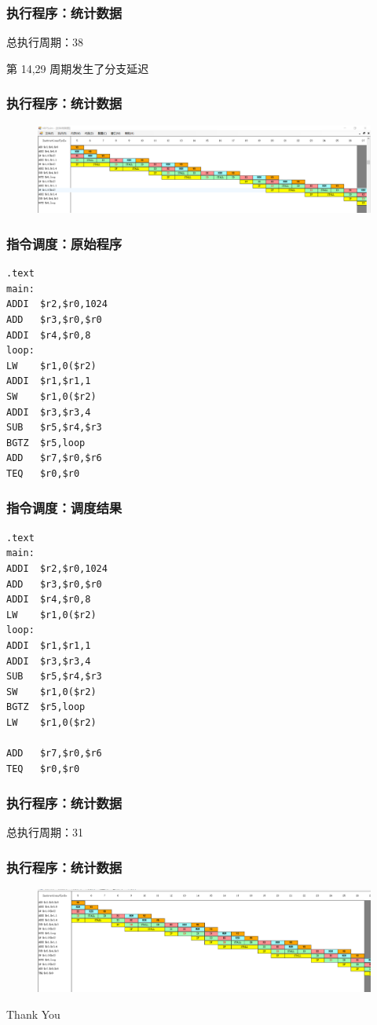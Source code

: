\documentclass[UTF8]{ctexbeamer}
\begin{document}
\begin{frame}
    \frametitle{执行程序：统计数据}
    \centering 总执行周期：38

    \centering 第 14,29 周期发生了分支延迟
\end{frame}

\begin{frame}
    \frametitle{执行程序：统计数据}
    \begin{figure}[H]
        \centering
        \includegraphics[width=\textwidth]{fig/branch.png}
      \end{figure}
\end{frame}

\begin{frame}[fragile]
    \frametitle{指令调度：原始程序}
    \begin{lstlisting}
.text
main:
ADDI  $r2,$r0,1024
ADD   $r3,$r0,$r0
ADDI  $r4,$r0,8
loop:  
LW    $r1,0($r2)
ADDI  $r1,$r1,1
SW    $r1,0($r2)
ADDI  $r3,$r3,4
SUB   $r5,$r4,$r3
BGTZ  $r5,loop
ADD   $r7,$r0,$r6
TEQ   $r0,$r0
    \end{lstlisting}
\end{frame}

\begin{frame}[fragile]
    \frametitle{指令调度：调度结果}
    \begin{lstlisting}
.text
main:
ADDI  $r2,$r0,1024
ADD   $r3,$r0,$r0
ADDI  $r4,$r0,8
LW    $r1,0($r2)
loop:  
ADDI  $r1,$r1,1
ADDI  $r3,$r3,4
SUB   $r5,$r4,$r3
SW    $r1,0($r2)
BGTZ  $r5,loop
LW    $r1,0($r2)

ADD   $r7,$r0,$r6
TEQ   $r0,$r0
    \end{lstlisting}
\end{frame}

\begin{frame}
    \frametitle{执行程序：统计数据}
    \centering 总执行周期：31
\end{frame}

\begin{frame}
    \frametitle{执行程序：统计数据}
    \begin{figure}[H]
        \centering
        \includegraphics[width=\textwidth]{fig/delayed-branch.png}
      \end{figure}
\end{frame}

\begin{frame}
    \begin{center}
        \Huge Thank You
    \end{center}
\end{frame}
\end{document}
